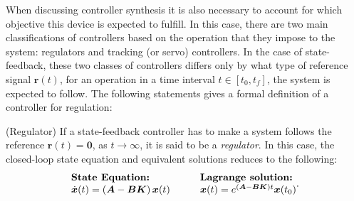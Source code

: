 \documentclass[a4paper,11pt]{book}
\numberwithin{figure}{chapter}
\numberwithin{equation}{chapter}
\numberwithin{table}{chapter}
\theoremstyle{definition}
\newtheorem{definition}{Definition}[chapter]
\newcounter{boxed-theorem}
\newcounter{boxed-definition}
\newenvironment{boxed-definition}[1]
{\colorlet{shadecolor}{pastelYellow!15} \begin{shaded} \begin{definition}{#1}}
{\end{definition} \end{shaded}}
\newcounter{boxed-example}
\begin{document}
When discussing controller synthesis it is also necessary to account for which objective this device is expected to fulfill. In this case, there are two main classifications of controllers based on the operation that they impose to the system: regulators and tracking (or servo) controllers. In the case of state-feedback, these two classes of controllers differs only by what type of reference signal $\bm{r}(t)$, for an operation in a time interval $t \in [t_0, t_f]$, the system is expected to follow. The following statements gives a formal definition of a controller for regulation:

\begin{boxed-definition}{(Regulator)} \label{def:regulator}
    If a state-feedback controller has to make a system follows the reference $\bm{r}(t) = \bm{0}$, as $t \to \infty$, it is said to be a \textit{regulator}. In this case, the closed-loop state equation and equivalent solutions reduces to the following:
        \begin{align}
    \begin{matrix*}[l]
    \textbf{State Equation:} \hfill & & & \textbf{Lagrange solution:} \hfill \\
    \dot{\bm{x}}(t) = \left( \bm{A} - \bm{B} \bm{K} \right) \bm{x}(t)  & & &
    \bm{x}(t) = e^{(\bm{A} - \bm{B} \bm{K}) t} \bm{x}(t_0) \hfill
    \end{matrix*}
    .\end{align}
\end{boxed-definition}
\end{document}
